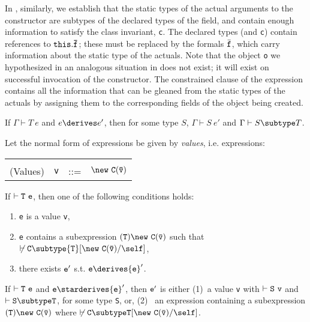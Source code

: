 In \TNew, similarly, we establish that the static types of the actual
arguments to the constructor are subtypes of the declared types of the
field, and contain enough information to satisfy the class invariant,
{\tt c}. The declared types (and {\tt c}) contain references to ${\tt
this.\bar{\tt f}}$; these must be replaced by the formals $\bar{\tt
f}$, which carry information about the static type of the
actuals. Note that the object {\tt o} we hypothesized in an analogous
situation in \TInvk{} does not exist; it will exist on successful
invocation of the constructor. The constrained clause of the \new{}
expression contains all the information that can be gleaned from the
static types of the actuals by assigning them to the corresponding
fields of the object being created.

\begin{theorem} 

If $\Gamma \vdash T\ e$ and $e \derives e'$, then for some type $S$,
$\Gamma \vdash S\ e'$ and $\Gamma \vdash S \subtype T$.

\end{theorem}

Let the normal form of expressions be given by {\em values},
i.e.{} expressions:

\begin{tabular}{rrcl}
&&&\\
(Values) & {\tt v} &{::=}& $\new\ {\tt C(\bar{\tt v})}$
\end{tabular}

\begin{theorem}[Progress] If $\vdash {\tt T\ e}$, then one of the following conditions holds:
\begin{enumerate}
\item {\tt e} is a value {\tt v}, 
\item {\tt e} contains a subexpression ${\tt (T)\new\ C(\bar{\tt
v})}$ such that
$\not\vdash {\tt C} \subtype {\tt T}[{\tt \new\ C(\bar{\tt v})}/\self]$,
\item there exists ${\tt e}'$ s.t. ${\tt e} \derives {\tt e}'$.
\end{enumerate}
\end{theorem}

\begin{theorem} 

If $\vdash {\tt T\ e}$ and ${\tt e} \starderives {\tt e}'$, then ${\tt e}'$ is
either (1)~a value {\tt v} with $\vdash {\tt S\ v}$ and $\vdash {\tt S
\subtype T}$, for some type {\tt S}, or, (2)~ an expression containing
a subexpression ${\tt (T)\new\ {\tt C(\bar{\tt v})}}$ where 
$\not\vdash \tt C\subtype T[\new\ C(\bar{\tt v})/\self]$.

\end{theorem}

